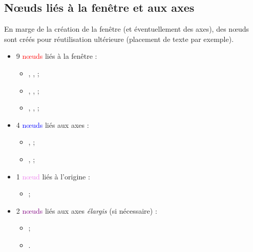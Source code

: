 \documentclass[11pt,a4paper]{ltxdoc}
\begin{document}
\pagebreak

\subsection{Nœuds liés à la fenêtre et aux axes}

En marge de la création de la fenêtre (et éventuellement des axes), des nœuds sont créés pour réutilisation ultérieure (placement de texte par exemple).

\begin{itemize}
  \item 9 \textcolor{red}{nœuds} liés à la fenêtre :
  \begin{itemize}
    \item {}, ,  ;
    \item {}, ,  ;
    \item {}, ,  ;
  \end{itemize}
  \item 4 \textcolor{blue}{nœuds} liés aux axes :
  \begin{itemize}
    \item {},  ;
    \item {},  ;
  \end{itemize}
  \item 1 \textcolor{violet}{nœud} liés à l'origine :
  \begin{itemize}
    \item {} ;
  \end{itemize}
  \item 2 \textcolor{purple}{nœuds} liés aux axes \textit{élargis} (si nécessaire) :
  \begin{itemize}
    \item {} ;
    \item {}.
  \end{itemize}
\end{itemize}
\end{document}
